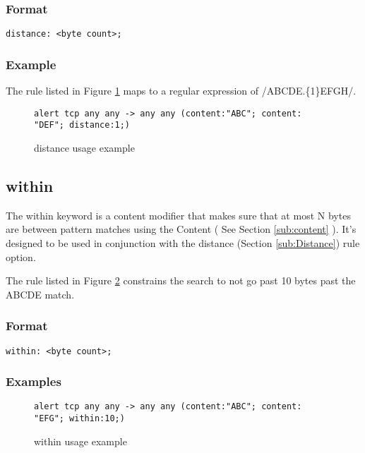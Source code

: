 \documentclass[english]{report}
\begin{document}
\subsubsection{Format}

\begin{verbatim}
distance: <byte count>;
\end{verbatim}

\subsubsection{Example}

The rule listed in Figure \ref{fig:Distance} maps to a regular
expression of /ABCDE.\{1\}EFGH/.

\begin{figure}[!hbpt]
\begin{verbatim}
alert tcp any any -> any any (content:"ABC"; content: "DEF"; distance:1;)
\end{verbatim}
\caption{distance usage example \label{fig:Distance}}
\end{figure}



\subsection{within\label{sub:Within}}

The within keyword is a content modifier that makes sure that
at most N bytes are between pattern matches using the Content ( See
Section \ref{sub:content} ).  It's designed to be used in conjunction
with the distance (Section \ref{sub:Distance}) rule option.

The rule listed in Figure \ref{fig:Within} constrains the search to not
go past 10 bytes past the ABCDE match. 

\subsubsection{Format}

\begin{verbatim}
within: <byte count>;
\end{verbatim}

\subsubsection{Examples}

\begin{figure}[!hbpt]
\begin{verbatim}
alert tcp any any -> any any (content:"ABC"; content: "EFG"; within:10;)
\end{verbatim}
\caption{within usage example \label{fig:Within}}
\end{figure}
\end{document}
